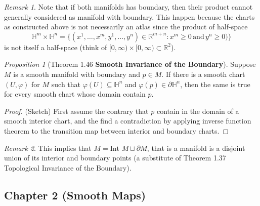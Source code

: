\documentclass[a4paper]{article}
\theoremstyle{remark}
\newtheorem*{remark}{Remark}
\newtheorem{prop}{Proposition}
\newcommand{\hn}{\mathbb{H}^n} %
\newcommand{\doo}{\partial}    %
\newcommand{\subhim}{\subseteq} %
\newcommand{\Inter}{\text{Int }} %
\begin{document}
\begin{remark}
Note that if both manifolds has boundary, then their product cannot generally considered as manifold with boundary. This happen because the charts as constructed above is not necessarily an atlas since the product of half-space 
$$
\mathbb{H}^m \times \hn = \{ (x^1,\dots,x^m,y^1,\dots,y^n) \in \mathbb{R}^{m+n} : x^m \geq 0 \, \text{and} \, y^n \geq 0 )  \}
$$ is not itself a half-space (think of $[0,\infty) \times [0,\infty) \subset \mathbb{R}^2$).
\end{remark}

\begin{prop}[Theorem 1.46 \textbf{Smooth Invariance of the Boundary}]
	Suppose $M$ is a smooth manifold with boundary and $p \in M$. If there is a smooth chart $(U, \varphi)$ for $M$ such that $\varphi(U) \subhim \hn$ and $\varphi(p) \in \partial\mathbb{H}^n$, then the same is true for every smooth chart whose domain contain $p$.
\end{prop}
\begin{proof}
	(Sketch) First assume the contrary that $p$ contain in the domain of a smooth interior chart, and the find a contradiction by applying inverse function theorem to the transition map between interior and boundary charts. 
\end{proof}

\begin{remark}
	This implies that $M = \Inter M \sqcup \doo M$, that is a manifold is a disjoint union of its interior and boundary points (a substitute of Theorem 1.37 Topological Invariance of the Boundary).
\end{remark}

\subsection{Chapter 2 (Smooth Maps)}
\end{document}
